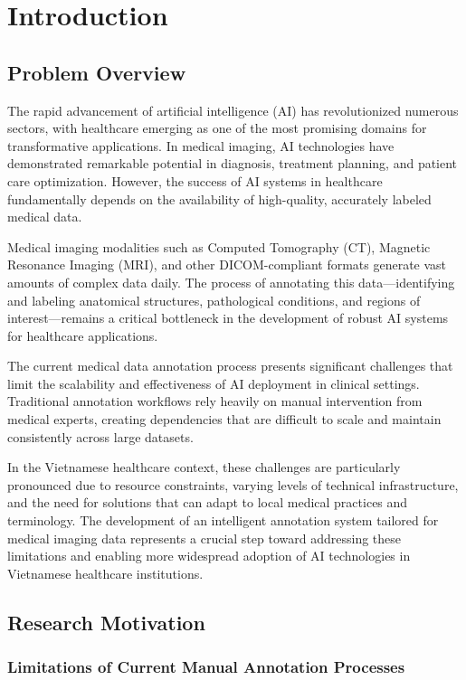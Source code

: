 \chapter{Introduction}

\section{Problem Overview}

The rapid advancement of artificial intelligence (AI) has revolutionized numerous sectors, with healthcare emerging as one of the most promising domains for transformative applications. In medical imaging, AI technologies have demonstrated remarkable potential in diagnosis, treatment planning, and patient care optimization. However, the success of AI systems in healthcare fundamentally depends on the availability of high-quality, accurately labeled medical data.

Medical imaging modalities such as Computed Tomography (CT), Magnetic Resonance Imaging (MRI), and other DICOM-compliant formats generate vast amounts of complex data daily. The process of annotating this data—identifying and labeling anatomical structures, pathological conditions, and regions of interest—remains a critical bottleneck in the development of robust AI systems for healthcare applications.

The current medical data annotation process presents significant challenges that limit the scalability and effectiveness of AI deployment in clinical settings. Traditional annotation workflows rely heavily on manual intervention from medical experts, creating dependencies that are difficult to scale and maintain consistently across large datasets.

In the Vietnamese healthcare context, these challenges are particularly pronounced due to resource constraints, varying levels of technical infrastructure, and the need for solutions that can adapt to local medical practices and terminology. The development of an intelligent annotation system tailored for medical imaging data represents a crucial step toward addressing these limitations and enabling more widespread adoption of AI technologies in Vietnamese healthcare institutions.

\section{Research Motivation}

\subsection{Limitations of Current Manual Annotation Processes}

